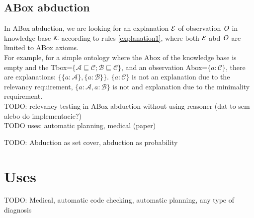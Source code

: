 \subsection{ABox abduction}
In ABox abduction, we are looking for an explanation $\mathcal{E}$ of observation $\mathit{O}$ in knowledge base $\mathcal{K}$ according to rules \ref{explanation1}, where both $\mathcal{E}$ abd $\mathit{O}$ are limited to ABox axioms. \\

For example, for a simple ontology where the Abox of the knowledge base is empty and the Tbox=$\{ \mathcal{A} \sqsubseteq \mathcal{C} ; \mathcal{B} \sqsubseteq \mathcal{C} \} $, and an observation Abox=$\{a:\mathcal{C}\}$, there are  explanations: $\{ \{a:\mathcal{A}\},\{ a: \mathcal{B}\}\}$.   $\{a:\mathcal{C}\}$ is not an explanation due to the relevancy requirement, $\{ a:\mathcal{A}, a:\mathcal{B} \}$ is not and explanation due to the minimality requirement. \\

TODO: relevancy testing in ABox abduction without using reasoner (dat to sem alebo do implementacie?)\\

TODO uses: automatic planning, medical (paper)



TODO: Abduction as set cover, abduction as probability
\section{Uses}
TODO: Medical, automatic code checking, automatic planning, any type of diagnosis